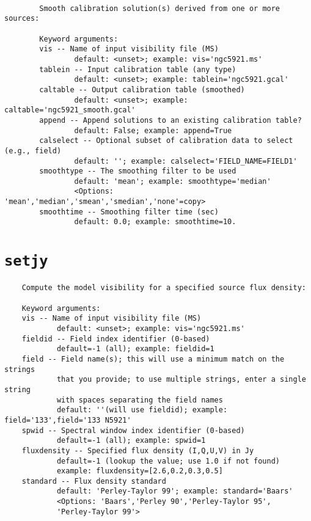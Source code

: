 \small
\begin{verbatim}

        Smooth calibration solution(s) derived from one or more sources:
        
        Keyword arguments:
        vis -- Name of input visibility file (MS)
                default: <unset>; example: vis='ngc5921.ms'
        tablein -- Input calibration table (any type)
                default: <unset>; example: tablein='ngc5921.gcal'
        caltable -- Output calibration table (smoothed)
                default: <unset>; example: caltable='ngc5921_smooth.gcal'
        append -- Append solutions to an existing calibration table?
                default: False; example: append=True
        calselect -- Optional subset of calibration data to select (e.g., field)
                default: ''; example: calselect='FIELD_NAME=FIELD1'
        smoothtype -- The smoothing filter to be used
                default: 'mean'; example: smoothtype='median'
                <Options: 'mean','median','smean','smedian','none'=copy>
        smoothtime -- Smoothing filter time (sec)
                default: 0.0; example: smoothtime=10.
\end{verbatim}
\normalsize


\section{{\tt setjy}}
\label{section:tasks.setjy}

\small
\begin{verbatim}
    Compute the model visibility for a specified source flux density: 
    
    Keyword arguments:
    vis -- Name of input visibility file (MS)
            default: <unset>; example: vis='ngc5921.ms'
    fieldid -- Field index identifier (0-based)
            default=-1 (all); example: fieldid=1
    field -- Field name(s); this will use a minimum match on the strings
            that you provide; to use multiple strings, enter a single string
            with spaces separating the field names
            default: ''(will use fieldid); example: field='133',field='133 N5921'
    spwid -- Spectral window index identifier (0-based)
            default=-1 (all); example: spwid=1
    fluxdensity -- Specified flux density (I,Q,U,V) in Jy
            default=-1 (lookup the value; use 1.0 if not found)
            example: fluxdensity=[2.6,0.2,0.3,0.5]
    standard -- Flux density standard
            default: 'Perley-Taylor 99'; example: standard='Baars'
            <Options: 'Baars','Perley 90','Perley-Taylor 95',
            'Perley-Taylor 99'>
\end{verbatim}
\normalsize


